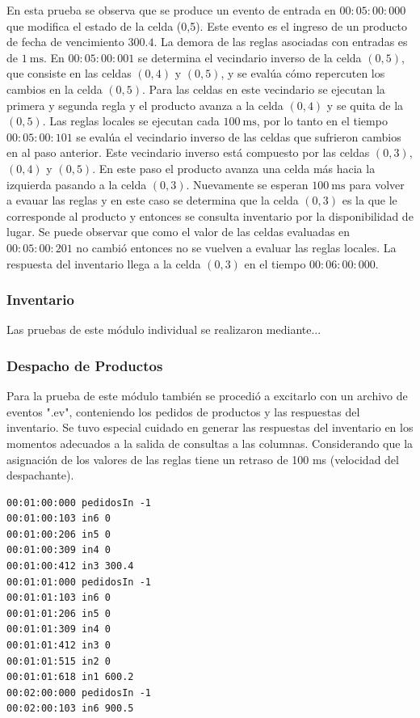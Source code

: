 \documentclass[10pt]{article}
\begin{document}
En esta prueba se observa que se produce un evento de entrada en $00:05:00:000$ que modifica el estado de la celda (0,5). Este evento es el ingreso de un producto de fecha de vencimiento $300.4$. La demora de las reglas asociadas con entradas es de $1~\textrm{ms}$. En $00:05:00:001$ se determina el vecindario inverso de la celda $(0,5)$, que consiste en las celdas $(0,4)$ y $(0,5)$, y se evalúa cómo repercuten los cambios en la celda $(0,5)$. Para las celdas en este vecindario se ejecutan la primera y segunda regla y el producto avanza a la celda $(0,4)$ y se quita de la $(0,5)$. Las reglas locales se ejecutan cada $100~\textrm{ms}$, por lo tanto en el tiempo $00:05:00:101$ se evalúa el vecindario inverso de las celdas que sufrieron cambios en al paso anterior. Este vecindario inverso está compuesto por las celdas $(0,3)$, $(0,4)$ y $(0,5)$. En este paso el producto avanza una celda más hacia la izquierda pasando a la celda $(0,3)$. Nuevamente se esperan $100~\textrm{ms}$ para volver a evauar las reglas y en este caso se determina que la celda $(0,3)$ es la que le corresponde al producto y entonces se consulta inventario por la disponibilidad de lugar. Se puede observar que como el valor de las celdas evaluadas en $00:05:00:201$ no cambió entonces no se vuelven a evaluar las reglas locales. La respuesta del inventario llega a la celda $(0,3)$ en el tiempo $00:06:00:000$.

\subsubsection{Inventario}
Las pruebas de este módulo individual se realizaron mediante...

\subsubsection{Despacho de Productos}
Para la prueba de este módulo también se procedió a excitarlo con un archivo de eventos ".ev", conteniendo los pedidos de productos y las respuestas del inventario. Se tuvo especial cuidado en generar las respuestas del inventario en los momentos adecuados a la salida de consultas a las columnas. Considerando que la asignación de los valores de las reglas tiene un retraso de 100 ms (velocidad del despachante).

\begin{minipage}{1\textwidth}
	\centering
	\begin{lstlisting}
00:01:00:000 pedidosIn -1
00:01:00:103 in6 0
00:01:00:206 in5 0
00:01:00:309 in4 0
00:01:00:412 in3 300.4
00:01:01:000 pedidosIn -1
00:01:01:103 in6 0
00:01:01:206 in5 0
00:01:01:309 in4 0
00:01:01:412 in3 0
00:01:01:515 in2 0
00:01:01:618 in1 600.2
00:02:00:000 pedidosIn -1
00:02:00:103 in6 900.5
	\end{lstlisting}	
\end{minipage}
\end{document}
